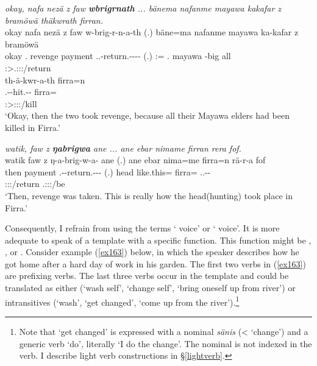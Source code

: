 \begin{exe}
	\ex
	\begin{xlist}
	\ex	\emph{okay, nafa nezä z faw \textbf{wbrigrnath} ... bänema nafanme mayawa kakafar z bramöwä thäkwrath firran.}\\
	\glll okay nafa nezä z faw w-brig-r-n-a-th (.) bäne=ma nafanme mayawa ka-kafar z bramöwä\\
	okay \Tnsg.\Erg{} revenge \Iam{} payment \Tsg.\F.\Alph-return.\Ext-\Lk-\Du-\Pst-\Stnsg{} (.) \Dem:\Med=\Char{} \Tnsg.\Poss{} mayawa \Redup-big \Iam{} all\\
	{} {} {} {} {} \footnotesize{\Stdu:\Sbj>\Tsg.\F:\Obj:\Pst:\Ipfv/return} {} {} {} {} {} {} {}\\
	\sn
	\glll th-ä-kwr-a-th firra=n\\
	\Stnsg.\Gam-\Vc\textbar\Ndu-hit.\Rs-\Pst-\Stnsg{} firra=\Loc\\
	\footnotesize{\Stpl:\Sbj>\Stpl:\Obj:\Pst:\Pfv/kill} {}\\
	\trans `Okay, then the two took revenge, because all their Mayawa elders had been killed in Firra.' 
	\label{ex159}

	\ex	\emph{watik, faw z \textbf{ŋabrigwa} ane ... ane ebar nimame firran rera fof.}\\
	\glll watik faw z ŋ-a-brig-w-a-\Zero{} ane (.) ane ebar nima=me firra=n rä-r-a fof\\
	then payment \Iam{} \M.\Alph-\Vc-return.\Ext-\Ndu-\Pst-\Stsg{} \Dem{} (.) \Dem{} head like.this=\Ins{} firra=\Loc{} \Tsg.\F.\Cop-\Lk-\Pst{} \Emph\\
	{} {} {} \footnotesize{\Stsg:\Sbj:\Pst:\Ipfv/return} {} {} {} {} {} {} \footnotesize{\Tsg.\F:\Sbj:\Pst:\Ipfv/be} {}\\
	\trans `Then, revenge was taken. This is really how the head(hunting) took place in Firra.' 
	\label{ex329}
	\end{xlist}
\end{exe}

Consequently, I refrain from using the terms ` voice' or ` voice'. It is more adequate to speak of a  template with a specific function. This function might be , ,  or . Consider example (\ref{ex163}) below, in which the speaker describes how he got home after a hard day of work in his garden. The first two verbs in (\ref{ex163}) are prefixing verbs. The last three verbs occur in the  template and could be translated as either  (`wash self', `change self', `bring oneself up from river') or intransitives (`wash', `get changed', `come up from the river').\footnote{Note that `get changed' is expressed with a nominal \emph{sänis} (<  `change') and a generic verb `do', literally `I do the change'. The nominal is not indexed in the verb. I describe light verb constructions in \S\ref{lightverb}.}

